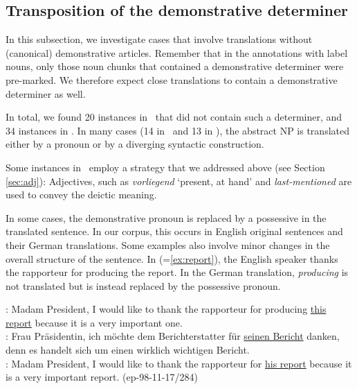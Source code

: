 \documentclass[output=paper]{LSP/langsci}
\begin{document}



\subsection{Transposition of the demonstrative determiner}
\label{sec:de}
In this subsection, we investigate cases that involve translations without (canonical) demonstrative articles. Remember that in the annotations with label nouns, only those noun chunks that contained a demonstrative determiner were pre-marked. We therefore expect close translations to contain a demonstrative determiner as well.

In total, we found 20 instances in \ENt\ that did not contain such a determiner, and 34 instances in \DEt. In many cases (14 in \ENt\ and 13 in \DEt), the abstract NP is translated either by a pronoun or by a diverging syntactic construction.

Some instances in \DEt\ employ a strategy that we addressed above (see Section \ref{sec:adj}): Adjectives, such as \textit{vorliegend} `present, at hand' and \textit{last-mentioned} are used to convey the deictic meaning.


In some cases, the demonstrative pronoun is replaced by a possessive in the translated sentence. In our corpus, this occurs in English original sentences and their German translations. Some examples also involve minor changes in the overall structure of the sentence. In  (=\ref{ex:report}), the English speaker thanks the rapporteur for producing the report. In the German translation, \textit{producing} is not translated but is instead replaced by the possessive pronoun. %


\ea \label{ex:poss1}  %
\ENo: Madam President, I would like to thank the rapporteur for producing \ul{this report} because it is a very important one.\\
\DEt: Frau Pr\"asidentin, ich m\"ochte dem Berichterstatter f\"ur \ul{seinen Bericht} danken, denn es handelt sich um einen wirklich wichtigen Bericht.\\
\DElit: Madam President, I would like to thank the rapporteur for \ul{his report} because it is a very important report. 
\hfill{(ep-98-11-17/284)}
\z
\end{document}
